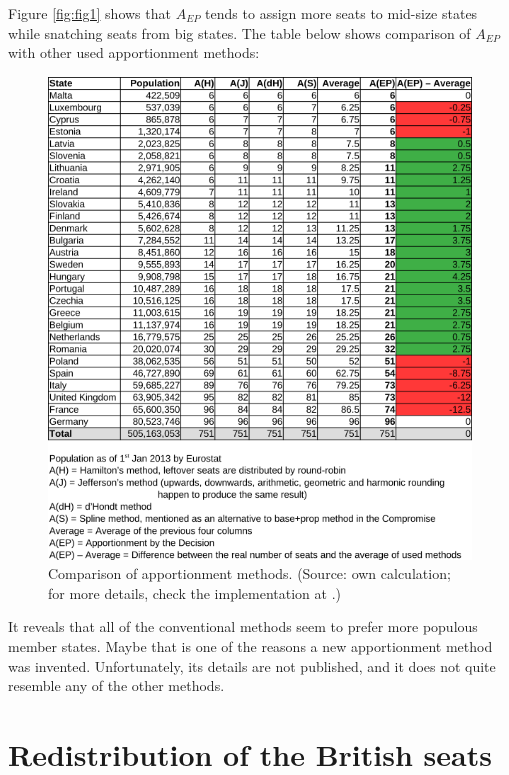 \documentclass[a4paper]{article}
\theoremstyle{definition}
\begin{document}
Figure \ref{fig:fig1} shows that $A_{EP}$ tends to assign more seats to mid-size states while snatching seats from big states. The table below shows comparison of $A_{EP}$ with other used apportionment methods:

\begin{figure}[th!]
	\begin{center}
		\includegraphics[scale=0.47]{g7093.png}
		\caption{Comparison of apportionment methods. (Source: own calculation; for more details, check the implementation at \cite{github}.)}
		\label{fig:fig2}
	\end{center}
\end{figure}
\pagebreak
It reveals that all of the conventional methods seem to prefer more populous member states. Maybe that is one of the reasons a new apportionment method was invented. Unfortunately, its details are not published, and it does not quite resemble any of the other methods.

\section{Redistribution of the British seats}
\end{document}
